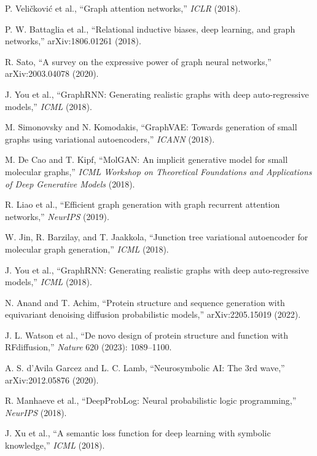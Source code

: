 \documentclass{article}
\begin{document}
\begin{thebibliography}{99}
 P. Veli\v{c}kovi\'{c} et al., ``Graph attention networks,'' \emph{ICLR} (2018).

 P. W. Battaglia et al., ``Relational inductive biases, deep learning, and graph networks,'' arXiv:1806.01261 (2018).

 R. Sato, ``A survey on the expressive power of graph neural networks,'' arXiv:2003.04078 (2020).

 J. You et al., ``GraphRNN: Generating realistic graphs with deep auto-regressive models,'' \emph{ICML} (2018).

 M. Simonovsky and N. Komodakis, ``GraphVAE: Towards generation of small graphs using variational autoencoders,'' \emph{ICANN} (2018).

 M. De Cao and T. Kipf, ``MolGAN: An implicit generative model for small molecular graphs,'' \emph{ICML Workshop on Theoretical Foundations and Applications of Deep Generative Models} (2018).

 R. Liao et al., ``Efficient graph generation with graph recurrent attention networks,'' \emph{NeurIPS} (2019).

 W. Jin, R. Barzilay, and T. Jaakkola, ``Junction tree variational autoencoder for molecular graph generation,'' \emph{ICML} (2018).

 J. You et al., ``GraphRNN: Generating realistic graphs with deep auto-regressive models,'' \emph{ICML} (2018).

 N. Anand and T. Achim, ``Protein structure and sequence generation with equivariant denoising diffusion probabilistic models,'' arXiv:2205.15019 (2022).

 J. L. Watson et al., ``De novo design of protein structure and function with RFdiffusion,'' \emph{Nature} 620 (2023): 1089--1100.

 A. S. d'Avila Garcez and L. C. Lamb, ``Neurosymbolic AI: The 3rd wave,'' arXiv:2012.05876 (2020).

 R. Manhaeve et al., ``DeepProbLog: Neural probabilistic logic programming,'' \emph{NeurIPS} (2018).

 J. Xu et al., ``A semantic loss function for deep learning with symbolic knowledge,'' \emph{ICML} (2018).


\end{thebibliography}
\end{document}
